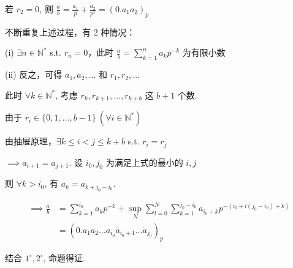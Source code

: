若 $r_2 = 0$, 则 $\frac{a}{b} = \frac{a_1}{p} + \frac{a_2}{p^2} = (0.a_1 a_2)_p$

不断重复上述过程，有 2 种情况：

(i) $\exists n \in \mathbb{N}^*$ s.t. $r_n = 0$，此时 $\frac{a}{b} = \sum_{k=1}^n a_k p^{-k}$ 为有限小数

(ii) 反之，可得 $a_1, a_2, \dots$ 和 $r_1, r_2, \dots$

此时 $\forall k \in \mathbb{N}^*$, 考虑 $r_k, r_{k+1}, \dots, r_{k+b}$ 这 $b+1$ 个数.

由于 $r_i \in \{0, 1, \dots, b-1\} \ (\forall i \in \mathbb{N}^*)$

由抽屉原理，$\exists k \le i < j \le k+b$ s.t. $r_i = r_j$

$\implies a_{i+1} = a_{j+1}$. 设 $i_0, j_0$ 为满足上式的最小的 $i, j$

则 $\forall k > i_0$, 有 $a_k = a_{k+j_0-i_0}$.

\begin{align*}
    \implies \frac{a}{b} &= \sum_{k=1}^{i_0} a_k p^{-k} + \sup_N \sum_{l=0}^N \sum_{k=1}^{j_0-i_0} a_{i_0+k} p^{-(i_0 + l(j_0-i_0) + k)} \\
    &= (0.a_1 a_2 \dots a_{i_0} \dot{a}_{i_0+1} \dots \dot{a}_{j_0})_p
\end{align*}

结合 $1^\circ, 2^\circ$, 命题得证.